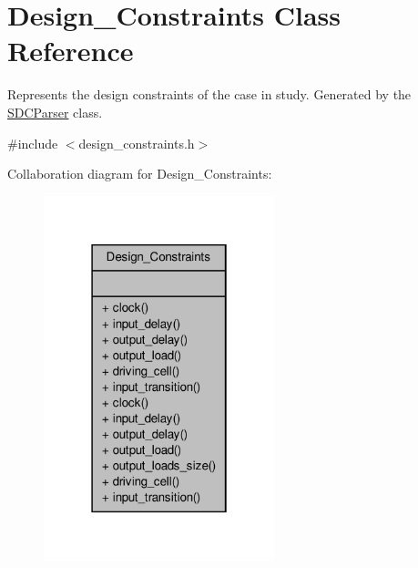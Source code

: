 \hypertarget{classDesign__Constraints}{\section{Design\-\_\-\-Constraints Class Reference}
\label{classDesign__Constraints}
}


Represents the design constraints of the case in study. Generated by the \hyperlink{classSDCParser}{S\-D\-C\-Parser} class.  




{\ttfamily \#include $<$design\-\_\-constraints.\-h$>$}



Collaboration diagram for Design\-\_\-\-Constraints\-:\nopagebreak
\begin{figure}[H]
\begin{center}
\leavevmode
\includegraphics[width=190pt]{classDesign__Constraints__coll__graph}
\end{center}
\end{figure}
